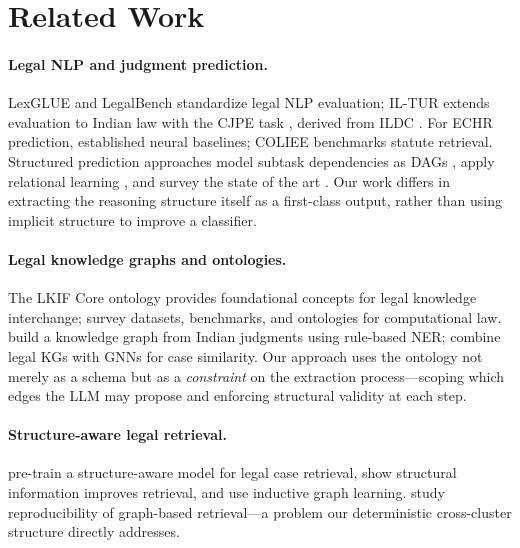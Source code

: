 \documentclass[11pt]{article}
\begin{document}
\section{Related Work}
\label{sec:related}

\paragraph{Legal NLP and judgment prediction.}
LexGLUE \cite{chalkidis2022lexglue} and LegalBench \cite{guha2023legalbench} standardize legal NLP evaluation; IL-TUR extends evaluation to Indian law with the CJPE task \cite{joshi2024iltur}, derived from ILDC \cite{malik2021ildc}. For ECHR prediction, \citet{chalkidis2019neural} established neural baselines; COLIEE \cite{rabelo2022coliee} benchmarks statute retrieval. Structured prediction approaches model subtask dependencies as DAGs \cite{zhong2018topological}, apply relational learning \cite{dong2021relational}, and survey the state of the art \cite{feng2022survey}. Our work differs in extracting the reasoning structure itself as a first-class output, rather than using implicit structure to improve a classifier.

\paragraph{Legal knowledge graphs and ontologies.}
The LKIF Core ontology \cite{hoekstra2007lkif} provides foundational concepts for legal knowledge interchange; \citet{kucuk2025computational} survey datasets, benchmarks, and ontologies for computational law. \citet{sarika2022kg} build a knowledge graph from Indian judgments using rule-based NER; \citet{dhani2024similar} combine legal KGs with GNNs for case similarity. Our approach uses the ontology not merely as a schema but as a \emph{constraint} on the extraction process---scoping which edges the LLM may propose and enforcing structural validity at each step.

\paragraph{Structure-aware legal retrieval.}
\citet{li2023sailer} pre-train a structure-aware model for legal case retrieval, \citet{ma2023structural} show structural information improves retrieval, and \citet{tang2024caselink} use inductive graph learning. \citet{trippas2025reproducibility} study reproducibility of graph-based retrieval---a problem our deterministic cross-cluster structure directly addresses.
\end{document}
